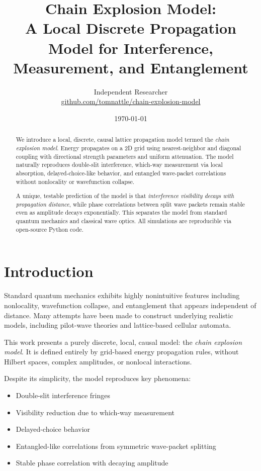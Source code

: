 \documentclass{article}
\begin{document}
\title{
Chain Explosion Model:\\
A Local Discrete Propagation Model for Interference, Measurement, and Entanglement
}

\author{
Independent Researcher \\
\href{https://github.com/tomnattle/chain-explosion-model}{github.com/tomnattle/chain-explosion-model}
}

\date{\today}

\maketitle

\begin{abstract}
We introduce a local, discrete, causal lattice propagation model termed the \emph{chain explosion model}.
Energy propagates on a 2D grid using nearest-neighbor and diagonal coupling with directional strength
parameters and uniform attenuation. The model naturally reproduces double-slit interference,
which-way measurement via local absorption, delayed-choice-like behavior, and entangled wave-packet
correlations without nonlocality or wavefunction collapse.

A unique, testable prediction of the model is that \emph{interference visibility decays with propagation distance},
while phase correlations between split wave packets remain stable even as amplitude decays exponentially.
This separates the model from standard quantum mechanics and classical wave optics.
All simulations are reproducible via open-source Python code.
\end{abstract}

\section{Introduction}
Standard quantum mechanics exhibits highly nonintuitive features including nonlocality,
wavefunction collapse, and entanglement that appears independent of distance.
Many attempts have been made to construct underlying realistic models,
including pilot-wave theories and lattice-based cellular automata.

This work presents a purely discrete, local, causal model:
the \emph{chain explosion model}. It is defined entirely by
grid-based energy propagation rules, without Hilbert spaces,
complex amplitudes, or nonlocal interactions.

Despite its simplicity, the model reproduces key phenomena:
\begin{itemize}
\item Double-slit interference fringes
\item Visibility reduction due to which-way measurement
\item Delayed-choice behavior
\item Entangled-like correlations from symmetric wave-packet splitting
\item Stable phase correlation with decaying amplitude
\end{itemize}
\end{document}
